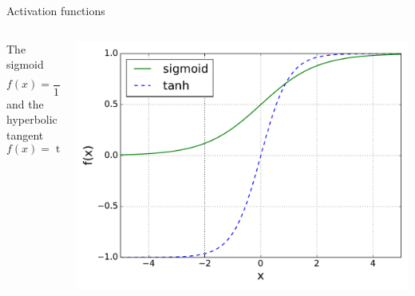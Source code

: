 \documentclass{beamer}
\begin{document}
\begin{frame}{Activation functions}

\begin{columns}[T] %

 \begin{column}[T]{0.5\linewidth} %
  The sigmoid
  \begin{equation*}
  f(x) = \frac{1}{1 + e^{-x}}
  \label{sigmoidActivationFunction}
  \end{equation*}
  and the hyperbolic tangent
  \begin{equation*}
  f(x) = \tanh(x)
  \label{tanhActivationFunction}
  \end{equation*}
 \end{column}
 
 \begin{column}[T]{0.5\linewidth} %
  \centering
  \includegraphics[width=\linewidth]{../Figures/Theory/activationFunctionsAltered.pdf}
 \end{column}
 
\end{columns}
  
\end{frame}
\end{document}
